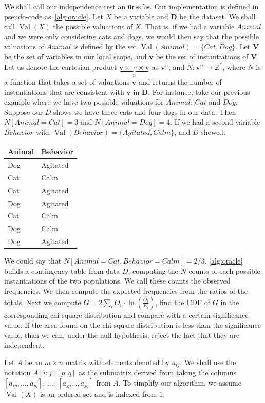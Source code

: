 \documentclass{amsart}
\DeclareMathOperator*{\Val}{\text{Val}}
\theoremstyle{plain}
\numberwithin{equation}{section}
\newcommand{\set}[1]{\mathbf{#1}}
\newcommand{\code}[1]{\lstinline[mathescape=true]{#1}}
\begin{document}
We shall call our independence test an \code{Oracle}. Our implementation is defined in pseudo-code
as~\autoref{alg:oracle}. Let $X$ be a variable and $\set{D}$ be the dataset. We shall call
$\Val(X)$ the possible valuations of $X$. That is, if we had a variable $Animal$ and we were only
considering cats and dogs, we would then say that the possible valuations of $Animal$ is defined
by the set $\Val(Animal)=\{Cat, Dog\}$. Let $\set{V}$ be the set of variables in our local scope,
and $\set{v}$ be the set of instantiations of $\set{V}$. Let us denote the cartesian product
$\underbrace{\set{v}\times\cdots\times\set{v}}_n$ as $\set{v}^n$, and $N:\set{v}^n\to
\mathbb{Z^*}$, where $N$ is a function that takes a set of valuations $\set{v}$ and returns the
number of instantiations that are consistent with $\set{v}$ in $\set{D}$. For instance, take our
previous example where we have two possible valuations for $Animal$: $Cat$ and $Dog$. Suppose our
$D$ shows we have three cats and four dogs in our data. Then $N[Animal=Cat]=3$ and
$N[Animal=Dog]=4$. If we had a second variable $Behavior$ with $\Val(Behavior)=\{Agitated, Calm\}$,
and $D$ showed:

\begin{tabular}{l l}
  \textbf{Animal} & \textbf{Behavior}\\
  \midrule
  Dog    & Agitated\\
  Cat    & Calm\\
  Cat    & Agitated\\
  Dog    & Agitated\\
  Cat    & Calm\\
  Dog    & Calm\\
  Dog    & Agitated\\
\end{tabular}

We could say that $N[Animal=Cat, Behavior=Calm]=2/3$. \autoref{alg:oracle} builds a contingency
table from data $D$, computing the $N$ counts of each possible instantiations of the two
populations. We call these counts the observed frequencies. We then compute the expected
frequencies from the ratios of the totals. Next we compute $G=2\sum_i O_i\cdot\ln\left(
\frac{O_i}{E_i}\right)$, find the CDF of $G$ in the corresponding chi-square distribution and
compare with a certain significance value. If the area found on the chi-square distribution is
less than the significance value, than we can, under the null hypothesis, reject the fact that
they are independent.

Let $A$ be an $m\times n$ matrix with elements denoted by $a_{ij}$. We shall use the notation
$A[i:j][p:q]$ as the submatrix derived from taking the columns $[a_{ip},\dots,a_{iq}]$, $\ldots$,
$[a_{jp}\ldots,a_{jq}]$ from $A$. To simplify our algorithm, we assume $\Val(X)$ is an ordered set
and is indexed from $1$.
\end{document}
